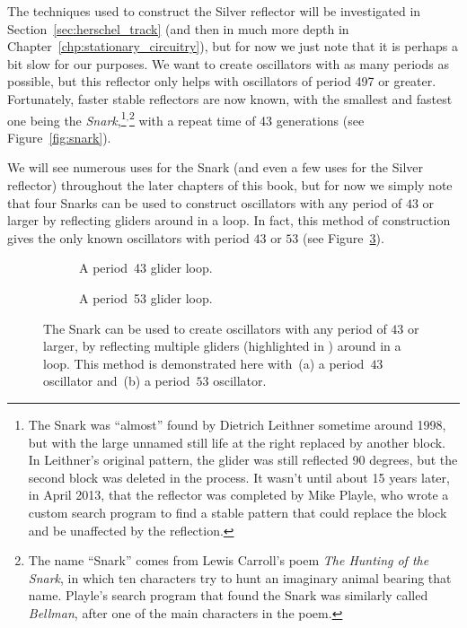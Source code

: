 The techniques used to construct the Silver reflector will be investigated in Section~\ref{sec:herschel_track} (and then in much more depth in Chapter~\ref{chp:stationary_circuitry}), but for now we just note that it is perhaps a bit slow for our purposes. We want to create oscillators with as many periods as possible, but this reflector only helps with oscillators of period 497 or greater. Fortunately, faster stable reflectors are now known, with the smallest and fastest one being the \emph{Snark},\footnote{The Snark was ``almost'' found by Dietrich Leithner sometime around 1998, but with the large unnamed still life at the right replaced by another block. In Leithner's original pattern, the glider was still reflected 90 degrees, but the second block was deleted in the process. It wasn't until about 15 years later, in April 2013, that the reflector was completed by Mike Playle, who wrote a custom search program to find a stable pattern that could replace the block and be unaffected by the reflection.}$^{,}$\footnote{The name ``Snark'' comes from Lewis Carroll's poem \emph{The Hunting of the Snark}, in which ten characters try to hunt an imaginary animal bearing that name. Playle's search program that found the Snark was similarly called \emph{Bellman}, after one of the main characters in the poem.} with a repeat time of 43 generations (see Figure~\ref{fig:snark}).

We will see numerous uses for the Snark (and even a few uses for the Silver reflector) throughout the later chapters of this book, but for now we simply note that four Snarks can be used to construct oscillators with any period of $43$ or larger by reflecting gliders around in a loop. In fact, this method of construction gives the only known oscillators with period $43$ or $53$ (see Figure~\ref{fig:period_43_53}).

\begin{figure}[!htb]
	\centering
	\begin{subfigure}{.5\textwidth}
		\centering
		\caption{A period~43 glider loop.}
		\label{fig:period_43}
	\end{subfigure}%
	\begin{subfigure}{.5\textwidth}
		\centering
		\caption{A period~53 glider loop.}
		\label{fig:period_53}
	\end{subfigure}
	\caption{The Snark can be used to create oscillators with any period of $43$ or larger, by reflecting multiple gliders (highlighted in ) around in a loop. This method is demonstrated here with~(a) a period~$43$ oscillator and~(b) a period~$53$ oscillator.}
	\label{fig:period_43_53}
\end{figure}


